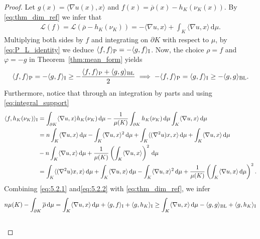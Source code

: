 \documentclass[a4paper, 11pt]{article}
\newcommand{\rhobar}{\overline{\rho}}
\theoremstyle{definition}
\newcommand{\di}{\, \mathrm{d}}
\begin{document}
\begin{proof}
Let $g(x)=\langle \nabla u(x),x\rangle$ and $f(x)=\overline{\rho}(x)-h_{K}(\nu_{K}(x))$. By \eqref{eq:thm_dim_ref} we infer that
\begin{align*}
\mathcal{L}(f) = \mathcal{L}(\overline{\rho}-h_{K}(\nu_K)) = -\langle \nabla u,x\rangle +\int_{ K} \langle \nabla u,x \rangle \di \mu.
\end{align*}
Multiplying both sides by $f$ and integrating on $\partial K$ with respect to $\mu$, by \eqref{eq:P_L_identity} we deduce $\langle f,f\rangle_{{\rm P}} = -\langle g,f\rangle_{\rm I}$. Now, the choice $\rho = f$ and $\varphi = -g$ in Theorem~\ref{thm:mean_form} yields
\begin{equation}\label{eq:5.2.1}
\langle f,f\rangle_{{\rm P}} = -\langle g,f\rangle_{\rm I} \geq -\frac{\langle f,f\rangle_{{\rm P}}+\langle g,g\rangle_{{\rm BL}}}{2} \implies -\langle f,f\rangle_{{\rm P}} = \langle g,f\rangle_{\rm I} \geq -\langle g,g\rangle_{{\rm BL}}.
\end{equation}
Furthermore, notice that through an integration by parts and using \eqref{eq:integral_support}
\begin{align}\label{eq:5.2.2}
    \notag \langle f,h_{K}(\nu_K)\rangle_{{\rm I}} &= \int_{\partial K} \langle \nabla u,x \rangle h_{K}(\nu_{K}) \di \mu-\frac{1}{\mu(K)} \int_{\partial K}h_{K}(\nu_{K})\di \mu\int_{K}\langle \nabla u,x \rangle \di \mu \notag \\
    \notag &= n\int_{K}\langle \nabla u,x \rangle \di \mu -\int_{K}\langle \nabla u,x \rangle^2 \di \mu+\int_{K}\langle (\nabla^2u)x,x\rangle \di \mu+ \int_{K}\langle \nabla u,x \rangle \di \mu\\ \notag &-n\int_{K}\langle \nabla u,x \rangle\di \mu +\frac{1}{\mu(K)}\left(\int_{K} \langle \nabla u, x \rangle\right)^2 \di \mu\notag \\
    &= \int_{K}\langle (\nabla^2u)x,x\rangle \di \mu+\int_{K}\langle \nabla u,x\rangle\di \mu - \int_{K}\langle \nabla u,x \rangle^2\di \mu+\frac{1}{\mu(K)}\left(\int_{K} \langle \nabla u, x \rangle \di \mu\right)^2.
\end{align}
Combining \eqref{eq:5.2.1} and\eqref{eq:5.2.2} with \eqref{eq:thm_dim_ref}, we infer 
\begin{align}
    \notag n\mu(K) - \int_{\partial K }\rhobar \di \mu&= \int_{K}\langle \nabla u, x \rangle \di \mu+ \langle g,f\rangle_{{\rm I}}+\langle g,h_{K}\rangle_{{\rm I}} \geq \int_{K}\langle \nabla u, x \rangle \di \mu- \langle g,g\rangle_{{\rm BL}}+\langle g,h_{K}\rangle_{{\rm I}} \\ \notag

\end{align}
\end{proof}
\end{document}
